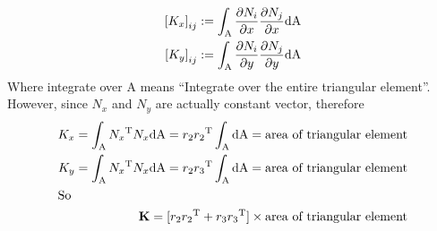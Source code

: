 \newcommand{\intd}[1]{
  \ensuremath{
    \int_{\text{A}}
    #1
    \text{dA}
  }
}
\def\f#1{
  \ensuremath{
    \Mij{K_{#1}} := \intd{\dX[#1]{N_i} \dX[#1]{N_j}}
  }
}
\def\dN#1{
  \ensuremath{\dX[#1]{\N}}
}
\def\dNdN#1{\tr{N_{x}}N_{x}}

\begin{align}
  \f{x} \notag\\
  \f{y}
  \notag
\end{align}
Where integrate over A means ``Integrate over the entire triangular element''.
However, since $N_x$ and $N_y$ are actually constant vector, therefore
\def\ar{ \text{area of triangular element}}
\begin{align}
  K_x  = \intd{\dNdN{x}} = r_2\tr{r_2} \intd{} = \ar \notag\\ 
  K_y = \intd{\dNdN{y}}  = r_2\tr{r_3} \intd{} = \ar \notag\\
  \intertext{So}
  \K = [r_2\tr{r_2} + r_3\tr{r_3}] \times \ar \label{eq:triK}
\end{align}

